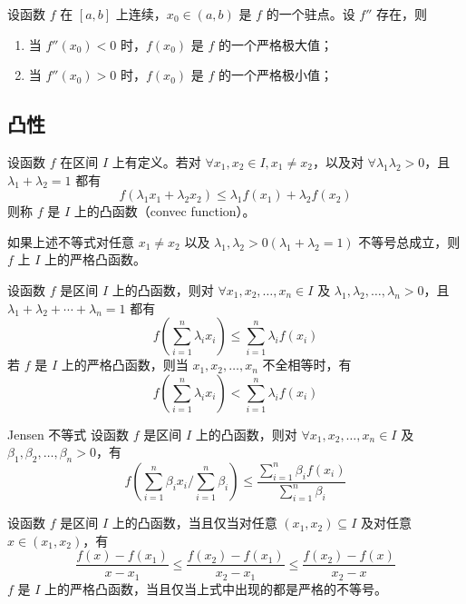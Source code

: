 \begin{theorem}
  设函数 $f$ 在 $[a,b]$ 上连续，$x_0 \in (a,b)$ 是 $f$ 的一个驻点。设 $f''$ 存在，则
  \begin{enumerate}
    \item 当 $f''(x_0) < 0$ 时，$f(x_0)$ 是 $f$ 的一个严格极大值；
    \item 当 $f''(x_0) > 0$ 时，$f(x_0)$ 是 $f$ 的一个严格极小值；
  \end{enumerate}
\end{theorem}

\subsection{凸性}

\begin{definition}
  设函数 $f$ 在区间 $I$ 上有定义。若对 $\forall x_1,x_2 \in I, x_1 \ne x_2$，以及对 $\forall \lambda_1 \lambda_2 > 0$，且 $\lambda_1 + \lambda_2 = 1$ 都有
  \[f(\lambda_{1}x_1 + \lambda_{2}x_2) \leqslant \lambda_{1}f(x_1) + \lambda_{2}f(x_2)\]
  则称 $f$ 是 $I$ 上的凸函数（convec function）。

  如果上述不等式对任意 $x_1 \ne x_2$ 以及 $\lambda_1,\lambda_2 > 0(\lambda_1 + \lambda_2 = 1)$ 不等号总成立，则 $f$ 上 $I$ 上的严格凸函数。
\end{definition}

\begin{theorem}
  设函数 $f$ 是区间 $I$ 上的凸函数，则对 $\forall x_1,x_2, \ldots ,x_n \in I$ 及 $\lambda_1,\lambda_2, \ldots ,\lambda_n > 0$，且 $\lambda_1 + \lambda_2 + \cdots + \lambda_n = 1$ 都有
  \[f(\sum_{i = 1}^{n}\lambda_{i}x_i) \leqslant \sum_{i = 1}^{n}\lambda_{i}f(x_i)\]
    若 $f$ 是 $I$ 上的严格凸函数，则当 $x_1,x_2, \ldots ,x_n$ 不全相等时，有
  \[f(\sum_{i = 1}^{n}\lambda_{i}x_i) < \sum_{i = 1}^{n}\lambda_{i}f(x_i)\]
\end{theorem}

\begin{theorem}{Jensen 不等式}
  设函数 $f$ 是区间 $I$ 上的凸函数，则对 $\forall x_1,x_2, \ldots ,x_n \in I$ 及 $\beta_1,\beta_2, \ldots ,\beta_n >0$，有 
  \[f(\sum_{i = 1}^{n}\beta_{i}x_{i}/\sum_{i = 1}^{n}\beta_i) \leqslant \frac{\displaystyle \sum_{i = 1}^{n}\beta_{i}f(x_i)}{\displaystyle \sum_{i = 1}^{n}\beta_i}\]
\end{theorem}

\begin{theorem}
  设函数 $f$ 是区间 $I$ 上的凸函数，当且仅当对任意 $(x_1,x_2) \subseteq I$ 及对任意 $x \in (x_1,x_2)$，有
  \[\frac{f(x) - f(x_1)}{x - x_1} \leqslant \frac{f(x_2) - f(x_1)}{x_2 - x_1} \leqslant \frac{f(x_2) - f(x)}{x_2 - x}\]
  $f$ 是 $I$ 上的严格凸函数，当且仅当上式中出现的都是严格的不等号。
\end{theorem}

